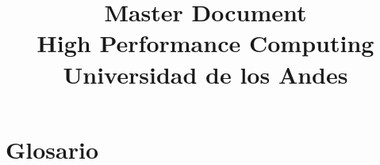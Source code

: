 \documentclass{article}
\title{Master Document\\
High Performance Computing\\
Universidad de los Andes}
\begin{document}
\maketitle



















\section{Glosario}
\end{document}
